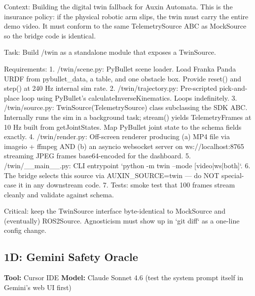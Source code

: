 \documentclass[11pt, a4paper]{article}
\begin{document}
\begin{promptbox}
Context: Building the digital twin fallback for Auxin Automata. This is the insurance policy: if the physical robotic arm slips, the twin must carry the entire demo video. It must conform to the same TelemetrySource ABC as MockSource so the bridge code is identical.

Task: Build /twin as a standalone module that exposes a TwinSource.

Requirements:
1. /twin/scene.py: PyBullet scene loader. Load Franka Panda URDF from pybullet_data, a table, and one obstacle box. Provide reset() and step() at 240 Hz internal sim rate.
2. /twin/trajectory.py: Pre-scripted pick-and-place loop using PyBullet's calculateInverseKinematics. Loops indefinitely.
3. /twin/source.py: TwinSource(TelemetrySource) class subclassing the SDK ABC. Internally runs the sim in a background task; stream() yields TelemetryFrames at 10 Hz built from getJointStates. Map PyBullet joint state to the schema fields exactly.
4. /twin/render.py: Off-screen renderer producing (a) MP4 file via imageio + ffmpeg AND (b) an asyncio websocket server on ws://localhost:8765 streaming JPEG frames base64-encoded for the dashboard.
5. /twin/__main__.py: CLI entrypoint `python -m twin --mode [video|ws|both]`.
6. The bridge selects this source via AUXIN_SOURCE=twin --- do NOT special-case it in any downstream code.
7. Tests: smoke test that 100 frames stream cleanly and validate against schema.

Critical: keep the TwinSource interface byte-identical to MockSource and (eventually) ROS2Source. Agnosticism must show up in `git diff` as a one-line config change.
\end{promptbox}

\subsection*{1D: Gemini Safety Oracle}
\textbf{Tool:} Cursor IDE \quad \textbf{Model:} Claude Sonnet 4.6 (test the system prompt itself in Gemini's web UI first)
\end{document}
